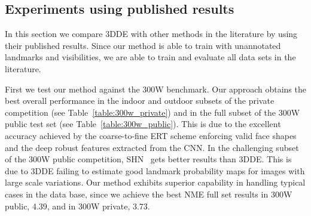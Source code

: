 \documentclass[11pt,twocolumn]{article}
\begin{document}
\subsection{Experiments using published results}
In this section we compare 3DDE with other methods in the literature by using their published results. Since our method is able to train with unannotated landmarks and visibilities, we are able to train and evaluate all data sets in the literature.

First we test our method against the 300W benchmark. Our approach obtains the best overall performance in the indoor and outdoor subsets of the private competition (see Table~\ref{table:300w_private}) and in the full subset of the 300W public test set (see Table~\ref{table:300w_public}). This is due to the excellent accuracy achieved by the coarse-to-fine ERT scheme enforcing valid face shapes and the deep robust features extracted from the CNN. In the challenging subset of the 300W public competition, SHN~\citep{Yang17} gets better results than 3DDE. This is due to 3DDE failing to estimate good landmark probability maps for images with large scale variations. Our method exhibits superior capability in handling typical cases in the data base, since we achieve the best NME full set results in 300W public, 4.39, and in 300W private, 3.73.
\end{document}
